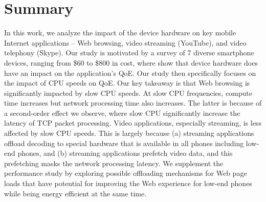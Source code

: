 
\section{Summary}

In this work, we analyze the impact of the device hardware on key mobile Internet applications -- Web browsing, video streaming (YouTube), and video telephony (Skype). Our study is motivated by a survey of 7 diverse smartphone devices, ranging from \$60 to \$800 in cost, where show that device hardware does have an impact on 
the application's QoE. Our study then
specifically focuses on the impact of CPU speeds on QoE. Our key takeaway is that Web browsing is significantly impacted by slow CPU speeds. At slow CPU frequencies, compute time increases but  network processing time also increases. The latter is because of a second-order effect we observe, where slow CPU significantly increase the latency of TCP packet processing. Video applications, especially streaming, is less affected by slow CPU speeds. This is largely because (a) streaming applications offload decoding to special hardware that is available in all phones including low-end phones, and (b) streaming applications prefetch video data, and this prefetching masks the network processing latency. We supplement the performance study by exploring
possible offloading mechanisms for Web page loads that 
have potential for improving the Web experience for low-end phones while being
energy efficient at the same time. 


%
%
